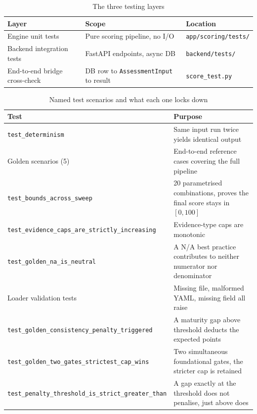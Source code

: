 \begin{table}[htbp]
  \centering
  \begin{tabular}{@{}p{3.4cm}p{6.1cm}p{4.6cm}@{}}
    \toprule
    Layer & Scope & Location \\
    \midrule
    Engine unit tests & Pure scoring pipeline, no I/O &
    \texttt{app/\allowbreak scoring/\allowbreak tests/} \\
    Backend integration tests & FastAPI endpoints, async DB &
    \texttt{backend/\allowbreak tests/} \\
    End-to-end bridge cross-check & DB row to \texttt{AssessmentInput} to
    result & \texttt{score\_test.py} \\
    \bottomrule
  \end{tabular}
  \caption{The three testing layers}
  \label{tab:validation-testing-layers}
\end{table}

\clearpage

\begin{table}[htbp]
  \centering
  \begin{tabular}{@{}p{5.6cm}p{9.4cm}@{}}
    \toprule
    Test & Purpose \\
    \midrule
    \texttt{test\_\allowbreak determinism} & Same input run twice yields identical output \\
    Golden scenarios (5) & End-to-end reference cases covering the full pipeline \\
    \texttt{test\_\allowbreak bounds\_\allowbreak across\_\allowbreak sweep} & 20 parametrised combinations, proves the final score stays in $[0, 100]$ \\
    \texttt{test\_\allowbreak evidence\_\allowbreak caps\_\allowbreak are\_\allowbreak strictly\_\allowbreak increasing} & Evidence-type caps are monotonic \\
    \texttt{test\_\allowbreak golden\_\allowbreak na\_\allowbreak is\_\allowbreak neutral} & A N/A best practice contributes to neither numerator nor denominator \\
    Loader validation tests & Missing file, malformed YAML, missing field all raise \\
    \texttt{test\_\allowbreak golden\_\allowbreak consistency\_\allowbreak penalty\_\allowbreak triggered} & A maturity gap above threshold deducts the expected points \\
    \texttt{test\_\allowbreak golden\_\allowbreak two\_\allowbreak gates\_\allowbreak strictest\_\allowbreak cap\_\allowbreak wins} & Two simultaneous foundational gates, the stricter cap is retained \\
    \texttt{test\_\allowbreak penalty\_\allowbreak threshold\_\allowbreak is\_\allowbreak strict\_\allowbreak greater\_\allowbreak than} & A gap exactly at the threshold does not penalise, just above does \\
    \bottomrule
  \end{tabular}
  \caption{Named test scenarios and what each one locks down}
  \label{tab:validation-test-profiles}
\end{table}


